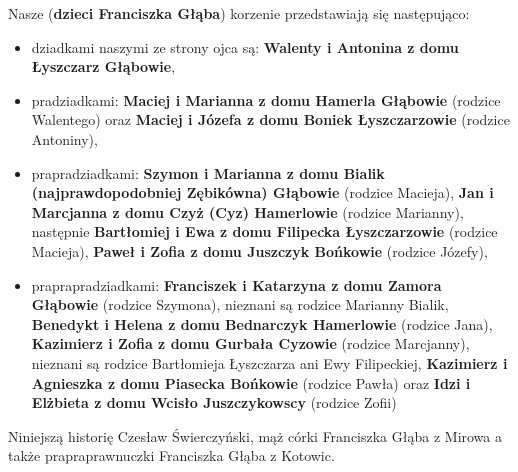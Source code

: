 Nasze (\textbf{dzieci Franciszka Głąba}) korzenie przedstawiają się następująco: 
\begin{itemize}
\item dziadkami naszymi ze strony ojca są: \textbf{Walenty i Antonina z domu Łyszczarz Głąbowie}, 
\item pradziadkami: \textbf{Maciej i Marianna z domu Hamerla Głąbowie} (rodzice Walentego) oraz \textbf{Maciej i Józefa z domu Boniek Łyszczarzowie} (rodzice Antoniny),
\item prapradziadkami: \textbf{Szymon i Marianna z domu Bialik (najprawdopodobniej Zębikówna) Głąbowie} (rodzice Macieja), \textbf{Jan i Marcjanna z domu Czyż (Cyz) Hamerlowie} (rodzice Marianny), następnie \textbf{Bartłomiej i Ewa z domu Filipecka Łyszczarzowie} (rodzice Macieja), \textbf{Paweł i Zofia z domu Juszczyk Bońkowie} (rodzice Józefy),
\item praprapradziadkami: \textbf{Franciszek i Katarzyna z domu Zamora Głąbowie} (rodzice Szymona), nieznani są rodzice Marianny Bialik, \textbf{Benedykt i Helena z domu Bednarczyk Hamerlowie} (rodzice Jana), \textbf{Kazimierz i Zofia z domu Gurbała Cyzowie} (rodzice Marcjanny), nieznani są rodzice Bartłomieja Łyszczarza ani Ewy Filipeckiej, \textbf{Kazimierz i Agnieszka z domu Piasecka Bońkowie} (rodzice Pawła) oraz \textbf{Idzi i Elżbieta z domu Wcisło Juszczykowscy} (rodzice Zofii)
\end{itemize}


Niniejszą historię Czesław Świerczyński, 
mąż córki Franciszka Głąba z Mirowa 
a także prapraprawnuczki Franciszka Głąba z Kotowic.




